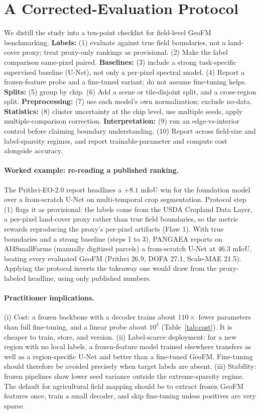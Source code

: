 \documentclass{article}
\begin{document}
\section{A Corrected-Evaluation Protocol}
\label{sec:protocol}
We distill the study into a ten-point checklist for field-level GeoFM benchmarking.
\textbf{Labels:} (1) evaluate against true field boundaries, not a land-cover proxy;
treat proxy-only rankings as provisional. (2) Make the label comparison same-pixel
paired. \textbf{Baselines:} (3) include a strong task-specific supervised baseline
(U-Net), not only a per-pixel spectral model. (4) Report a frozen-feature probe and a
fine-tuned variant; do not assume fine-tuning helps. \textbf{Splits:} (5) group by
chip. (6) Add a scene or tile-disjoint split, and a cross-region split.
\textbf{Preprocessing:} (7) use each model's own normalization; exclude no-data.
\textbf{Statistics:} (8) cluster uncertainty at the chip level, use multiple seeds,
apply multiple-comparison correction. \textbf{Interpretation:} (9) run an
edge-vs-interior control before claiming boundary understanding. (10) Report across
field-size and label-sparsity regimes, and report trainable-parameter and compute
cost alongside accuracy.

\paragraph{Worked example: re-reading a published ranking.} The Prithvi-EO-2.0 report
\citep{prithvi} headlines a $+8.1$ mIoU win for the foundation model over a
from-scratch U-Net on multi-temporal crop segmentation. Protocol step (1) flags it
as provisional: the labels come from the USDA Cropland Data Layer, a per-pixel
land-cover proxy rather than true field boundaries, so the metric rewards
reproducing the proxy's per-pixel artifacts (Flaw 1). With true boundaries and a
strong baseline (steps 1 to 3), PANGAEA \citep{pangaea} reports on AI4SmallFarms
\citep{ai4smallfarms} (manually digitized parcels) a from-scratch U-Net at 46.3
mIoU, beating every evaluated GeoFM (Prithvi 26.9, DOFA 27.1, Scale-MAE 21.5).
Applying the protocol inverts the takeaway one would draw from the proxy-labeled
headline, using only published numbers.

\paragraph{Practitioner implications.} (i) Cost: a frozen backbone with a decoder
trains about $110\times$ fewer parameters than full fine-tuning, and a linear probe
about $10^3$ (Table~\ref{tab:cost}). It is cheaper to train, store, and version.
(ii) Label-scarce deployment: for a new region with no local labels, a
frozen-feature model trained elsewhere transfers as well as a region-specific U-Net
and better than a fine-tuned GeoFM. Fine-tuning should therefore be avoided
precisely when target labels are absent. (iii) Stability: frozen pipelines show
lower seed variance outside the extreme-sparsity regime. The default for
agricultural field mapping should be to extract frozen GeoFM features once, train a
small decoder, and skip fine-tuning unless positives are very sparse.
\end{document}
